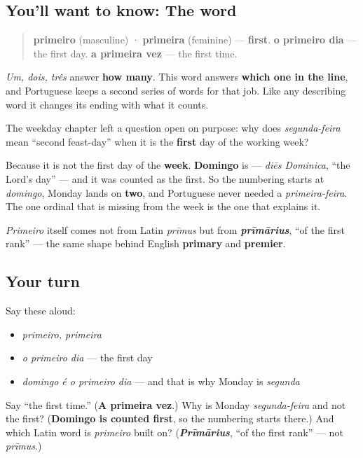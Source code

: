 \subsection*{You'll want to know: The word}
\begin{quote}
\textbf{primeiro} (masculine) · \textbf{primeira} (feminine) — \textbf{first}. \textbf{o primeiro dia} — the first day. \textbf{a primeira vez} — the first time.
\end{quote}

\emph{Um, dois, três} answer \textbf{how many}. This word answers \textbf{which one in the line}, and Portuguese keeps a second series of words for that job. Like any describing word it changes its ending with what it counts.

\begin{culture}
The weekday chapter left a question open on purpose: why does \emph{segunda-feira} mean \textquotedblleft{}second feast-day\textquotedblright{} when it is the \textbf{first} day of the working week?

Because it is not the first day of the \textbf{week}. \textbf{Domingo} is — \emph{diēs Dominica}, \textquotedblleft{}the Lord's day\textquotedblright{} — and it was counted as the first. So the numbering starts at \emph{domingo}, Monday lands on \textbf{two}, and Portuguese never needed a \emph{primeira-feira}. The one ordinal that is missing from the week is the one that explains it.

\emph{Primeiro} itself comes not from Latin \emph{prīmus} but from \emph{\textbf{prīmārius}}, \textquotedblleft{}of the first rank\textquotedblright{} — the same shape behind English \textbf{primary} and \textbf{premier}.
\end{culture}

\subsection*{Your turn}
Say these aloud:

\begin{itemize}
\raggedright
  \item \emph{primeiro, primeira}
  \item \emph{o primeiro dia} — the first day
  \item \emph{domingo é o primeiro dia} — and that is why Monday is \emph{segunda}
\end{itemize}

\begin{tcolorbox}[breakable,colback=teal!4,colframe=teal!35!black,title={Before you move on}]
Say \textquotedblleft{}the first time.\textquotedblright{} (\textbf{A primeira vez}.) Why is Monday \emph{segunda-feira} and not the first? (\textbf{Domingo is counted first}, so the numbering starts there.) And which Latin word is \emph{primeiro} built on? (\emph{\textbf{Prīmārius}}, \textquotedblleft{}of the first rank\textquotedblright{} — not \emph{prīmus}.)
\end{tcolorbox}

